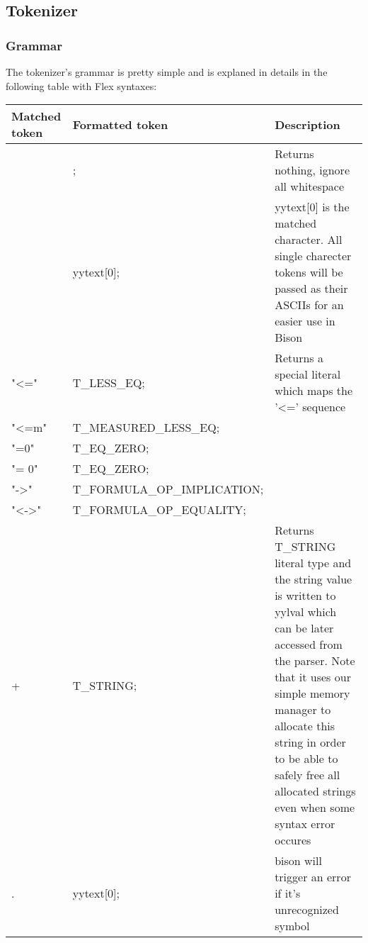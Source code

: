 \documentclass{article}
\begin{document}
	\subsection{Tokenizer}
	\subsubsection*{Grammar}
		The tokenizer's grammar is pretty simple and is explaned in details in the following table with Flex syntaxes:
		\begin{flushleft}
			\begin{tabular}{ | m{7em} | m{15em}| m{10em} | } 
				\hline
					Matched token & Formatted token & Description \\ [0.7ex] 
				\hline
					[ \textbackslash t \textbackslash  n] & ; & Returns nothing, ignore all whitespace \\ 
				\hline
					[,TF01()C\&|~*+-] 	& yytext[0]; & yytext[0] is the matched character. All single charecter tokens will be passed as their ASCIIs for an easier use in Bison \\
				\hline
				    "<="            &   T\_LESS\_EQ; & Returns a special literal which maps the '<=' sequence \\
				\hline
				    "<=m"           &   T\_MEASURED\_LESS\_EQ; & \\
				\hline
				    "=0"            &   T\_EQ\_ZERO; & \\
				\hline
				    "= 0"           &   T\_EQ\_ZERO; & \\
				\hline
				    "->"            &   T\_FORMULA\_OP\_IMPLICATION; & \\
				\hline
				    "<->"           &   T\_FORMULA\_OP\_EQUALITY; & \\
				\hline
				    [a-zA-Z0-9]+    &   T\_STRING; & Returns T\_STRING literal type and the string  value is written to yylval which can be later accessed from the parser. Note that it uses our simple memory manager to allocate this string in order to be able to safely free all allocated strings even when some syntax error occures \\
				\hline
				    .               &   yytext[0]; & bison will trigger an error if it's unrecognized symbol \\
				\hline

			\end{tabular}
		\end{flushleft}
\end{document}
